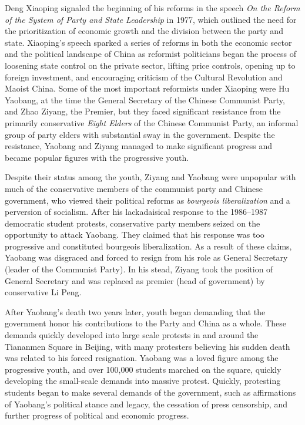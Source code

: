 \documentclass{paper}
\begin{document}
Deng Xiaoping signaled the beginning of his reforms in the speech \textit{On the Reform of the System of Party and State Leadership} in 1977, which outlined the need for the prioritization of economic growth and the division between the party and state.
Xiaoping's speech sparked a series of reforms in both the economic sector and the political landscape of China as reformist politicians began the process of loosening state control on the private sector, lifting price controls, opening up to foreign investment, and encouraging criticism of the Cultural Revolution and Maoist China.
Some of the most important reformists under Xiaoping were Hu Yaobang, at the time the General Secretary of the Chinese Communist Party, and Zhao Ziyang, the Premier, but they faced significant resistance from the primarily conservative \emph{Eight Elders} of the Chinese Communist Party, an informal group of party elders with substantial sway in the government.
Despite the resistance, Yaobang and Ziyang managed to make significant progress and became popular figures with the progressive youth.

Despite their status among the youth, Ziyang and Yaobang were unpopular with much of the conservative members of the communist party and Chinese government, who viewed their political reforms as \emph{bourgeois liberalization} and a perversion of socialism.
After his lackadaisical response to the 1986--1987 democratic student protests, conservative party members seized on the opportunity to attack Yaobang.
They claimed that his response was too progressive and constituted bourgeois liberalization.\autocite{deng}
As a result of these claims, Yaobang was disgraced and forced to resign from his role as General Secretary (leader of the Communist Party).
In his stead, Ziyang took the position of General Secretary and was replaced as premier (head of government) by conservative Li Peng.

After Yaobang's death two years later, youth began demanding that the government honor his contributions to the Party and China as a whole.
These demands quickly developed into large scale protests in and around the Tiananmen Square in Beijing, with many protesters believing his sudden death was related to his forced resignation.\autocite{calhoun}
Yaobang was a loved figure among the progressive youth, and over 100,000 students marched on the square, quickly developing the small-scale demands into massive protest.
Quickly, protesting students began to make several demands of the government, such as affirmations of Yaobang's political stance and legacy, the cessation of press censorship, and further progress of political and economic progress.
\end{document}
